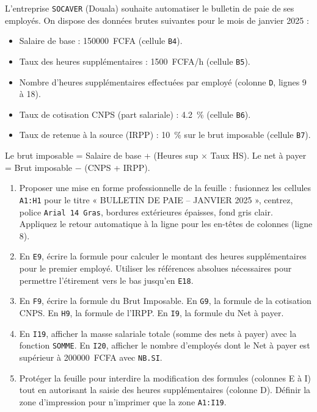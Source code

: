 \documentclass[11pt]{article}
\begin{document}
\begin{exercice}
L'entreprise \texttt{SOCAVER} (Douala) souhaite automatiser le bulletin de paie de ses employés. On dispose des données brutes suivantes pour le mois de janvier 2025 : 
\begin{itemize}
    \item Salaire de base : \SI{150000}{FCFA} (cellule \texttt{B4}).
    \item Taux des heures supplémentaires : \SI{1500}{FCFA/h} (cellule \texttt{B5}).
    \item Nombre d'heures supplémentaires effectuées par employé (colonne \texttt{D}, lignes 9 à 18).
    \item Taux de cotisation CNPS (part salariale) : \SI{4.2}{\%} (cellule \texttt{B6}).
    \item Taux de retenue à la source (IRPP) : \SI{10}{\%} sur le brut imposable (cellule \texttt{B7}).
\end{itemize}
Le brut imposable = Salaire de base + (Heures sup $\times$ Taux HS). Le net à payer = Brut imposable $-$ (CNPS + IRPP).
\begin{enumerate}
    \item Proposer une mise en forme professionnelle de la feuille : fusionnez les cellules \texttt{A1:H1} pour le titre « BULLETIN DE PAIE -- JANVIER 2025 », centrez, police \texttt{Arial 14 Gras}, bordures extérieures épaisses, fond gris clair. Appliquez le retour automatique à la ligne pour les en-têtes de colonnes (ligne 8).
    \item En \texttt{E9}, écrire la formule pour calculer le montant des heures supplémentaires pour le premier employé. Utiliser les références absolues nécessaires pour permettre l'étirement vers le bas jusqu'en \texttt{E18}.
    \item En \texttt{F9}, écrire la formule du Brut Imposable. En \texttt{G9}, la formule de la cotisation CNPS. En \texttt{H9}, la formule de l'IRPP. En \texttt{I9}, la formule du Net à payer.
    \item En \texttt{I19}, afficher la masse salariale totale (somme des nets à payer) avec la fonction \texttt{SOMME}. En \texttt{I20}, afficher le nombre d'employés dont le Net à payer est supérieur à \SI{200000}{FCFA} avec \texttt{NB.SI}.
    \item Protéger la feuille pour interdire la modification des formules (colonnes E à I) tout en autorisant la saisie des heures supplémentaires (colonne D). Définir la zone d'impression pour n'imprimer que la zone \texttt{A1:I19}.
\end{enumerate}
\end{exercice}
\end{document}

